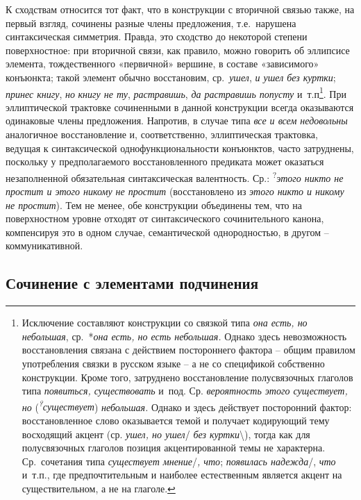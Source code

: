 К сходствам относится тот факт, что в конструкции с вторичной связью
также, на первый взгляд, сочинены разные члены предложения,
т.е.~нарушена синтаксическая симметрия. Правда, это сходство до
некоторой степени поверхностное: при вторичной связи, как правило, можно
говорить об эллипсисе элемента, тождественного «первичной» вершине, в
составе «зависимого» конъюнкта; такой элемент обычно восстановим,
ср.~\emph{ушел}, \emph{и ушел без куртки}; \emph{принес книгу},
\emph{но} \emph{книгу не ту}, \emph{растравишь}, \emph{да растравишь
попусту} и~т.п\footnote{Исключение составляют конструкции со связкой
  типа \emph{она есть, но небольшая}, ср.~*\emph{она есть, но есть
  небольшая.} Однако здесь невозможность восстановления связана с
  действием постороннего фактора -- общим правилом употребления связки в
  русском языке -- а не со спецификой собственно конструкции. Кроме
  того, затруднено восстановление полусвязочных глаголов типа
  \emph{появиться, существовать} и~под. Ср. \emph{вероятность этого
  существует, но} (\emph{\textsuperscript{?}существует})
  \emph{небольшая.} Однако и здесь действует посторонний фактор:
  восстановленное слово оказывается темой и получает кодирующий тему
  восходящий акцент (ср. \emph{ушел, но ушел}/ \emph{без
  куртки}\textbackslash), тогда как для полусвязочных глаголов позиция
  акцентированной темы не характерна. Ср.~сочетания типа
  \emph{существует мнение}/\emph{, что}; \emph{появилась надежда}/,
  \emph{что} и~т.п., где предпочтительным и наиболее естественным
  является акцент на существительном, а не на глаголе.}. При
эллиптической трактовке сочиненными в данной конструкции всегда
оказываются одинаковые члены предложения. Напротив, в случае типа
\emph{все и всем недовольны} аналогичное восстановление и,
соответственно, эллиптическая трактовка, ведущая к синтаксической
однофункциональности конъюнктов, часто затруднены, поскольку у
предполагаемого восстановленного предиката может оказаться незаполненной
обязательная синтаксическая валентность. Ср.:
\textsuperscript{?}\emph{этого никто не простит и этого никому не
простит} (восстановлено из \emph{этого никто и никому не простит}). Тем
не менее, обе конструкции объединены тем, что на поверхностном уровне
отходят от синтаксического сочинительного канона, компенсируя это в
одном случае, семантической однородностью, в другом -- коммуникативной.

\hypertarget{ux441ux43eux447ux438ux43dux435ux43dux438ux435-ux441-ux44dux43bux435ux43cux435ux43dux442ux430ux43cux438-ux43fux43eux434ux447ux438ux43dux435ux43dux438ux44f}{%
\subsection{Сочинение с элементами
подчинения}\label{ux441ux43eux447ux438ux43dux435ux43dux438ux435-ux441-ux44dux43bux435ux43cux435ux43dux442ux430ux43cux438-ux43fux43eux434ux447ux438ux43dux435ux43dux438ux44f}}

